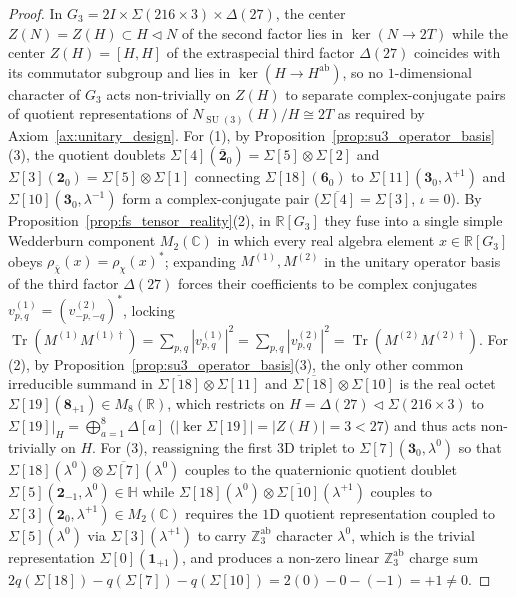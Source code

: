 \documentclass[11pt,a4paper]{article}
\theoremstyle{definition}
\theoremstyle{remark}
\newcommand{\R}{\mathbb{R}}
\newcommand{\C}{\mathbb{C}}
\newcommand{\quat}{\mathbb{H}}
\newcommand{\Z}{\mathbb{Z}}
\newcommand{\Tr}{\operatorname{Tr}}
\newcommand{\SU}{\operatorname{SU}}
\newcommand{\Gthree}{G_3}
\begin{document}
\begin{proof}
In $\Gthree = 2I \times \Sigma(216 \times 3) \times \Delta(27)$, the center $Z(N) = Z(H) \subset H \triangleleft N$ of the second factor lies in $\ker(N \to 2T)$ while the center $Z(H) = [H, H]$ of the extraspecial third factor $\Delta(27)$ coincides with its commutator subgroup and lies in $\ker(H \to H^{\mathrm{ab}})$, so no $1$-dimensional character of $\Gthree$ acts non-trivially on $Z(H)$ to separate complex-conjugate pairs of quotient representations of $N_{\SU(3)}(H)/H \cong 2T$ as required by Axiom~\ref{ax:unitary_design}. For (1), by Proposition~\ref{prop:su3_operator_basis}(3), the quotient doublets $\Sigma[4](\bar{\mathbf{2}}_0) = \Sigma[5] \otimes \Sigma[2]$ and $\Sigma[3](\mathbf{2}_0) = \Sigma[5] \otimes \Sigma[1]$ connecting $\Sigma[18](\mathbf{6}_0)$ to $\Sigma[11](\mathbf{3}_0, \lambda^{+1})$ and $\Sigma[10](\mathbf{3}_0, \lambda^{-1})$ form a complex-conjugate pair ($\overline{\Sigma[4]} = \Sigma[3]$, $\iota = 0$). By Proposition~\ref{prop:fs_tensor_reality}(2), in $\R[\Gthree]$ they fuse into a single simple Wedderburn component $M_2(\C)$ in which every real algebra element $x \in \R[\Gthree]$ obeys $\rho_{\bar{\chi}}(x) = \rho_\chi(x)^*$; expanding $M^{(1)}, M^{(2)}$ in the unitary operator basis of the third factor $\Delta(27)$ forces their coefficients to be complex conjugates $v_{p,q}^{(1)} = (v_{-p,-q}^{(2)})^*$, locking $\Tr(M^{(1)} M^{(1)\dagger}) = \sum_{p,q}|v_{p,q}^{(1)}|^2 = \sum_{p,q}|v_{p,q}^{(2)}|^2 = \Tr(M^{(2)} M^{(2)\dagger})$. For (2), by Proposition~\ref{prop:su3_operator_basis}(3), the only other common irreducible summand in $\overline{\Sigma[18]} \otimes \Sigma[11]$ and $\overline{\Sigma[18]} \otimes \Sigma[10]$ is the real octet $\Sigma[19](\mathbf{8}_{+1}) \in M_8(\R)$, which restricts on $H = \Delta(27) \triangleleft \Sigma(216 \times 3)$ to $\Sigma[19]|_H = \bigoplus_{a=1}^8 \Delta[a]$ ($|\ker\Sigma[19]| = |Z(H)| = 3 < 27$) and thus acts non-trivially on $H$. For (3), reassigning the first $3$D triplet to $\Sigma[7](\mathbf{3}_0, \lambda^0)$ so that $\Sigma[18](\lambda^0) \otimes \overline{\Sigma[7]}(\lambda^0)$ couples to the quaternionic quotient doublet $\Sigma[5](\mathbf{2}_{-1}, \lambda^0) \in \quat$ while $\Sigma[18](\lambda^0) \otimes \overline{\Sigma[10]}(\lambda^{+1})$ couples to $\Sigma[3](\mathbf{2}_0, \lambda^{+1}) \in M_2(\C)$ requires the $1$D quotient representation coupled to $\Sigma[5](\lambda^0)$ via $\Sigma[3](\lambda^{+1})$ to carry $\Z_3^{\mathrm{ab}}$ character $\lambda^0$, which is the trivial representation $\Sigma[0](\mathbf{1}_{+1})$, and produces a non-zero linear $\Z_3^{\mathrm{ab}}$ charge sum $2 q(\Sigma[18]) - q(\Sigma[7]) - q(\Sigma[10]) = 2(0) - 0 - (-1) = +1 \neq 0$.
\end{proof}
\end{document}

